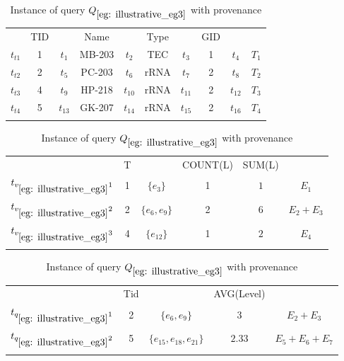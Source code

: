 \begin{example}
{\begin{table}[htp]
\begin{tabular}[t]{c|c|c|c|c|c|c|c|c|c|} \hhline{~---------}
&TID&&Name&&Type&&GID&&\\ \hhline{~---------}
$t_{t1}$&1&$t_1$&MB-203&$t_2$&TEC&$t_3$&1&$t_4$&$T_1$\\ \hhline{~---------}
$t_{t2}$&2&$t_5$&PC-203&$t_6$&rRNA&$t_7$&2&$t_8$&$T_2$\\ \hhline{~---------}
$t_{t3}$&4&$t_9$&HP-218&$t_{10}$&rRNA&$t_{11}$&2&$t_{12}$&$T_3$\\ \hhline{~---------}
$t_{t4}$&5&$t_{13}$&GK-207&$t_{14}$&rRNA&$t_{15}$&2&$t_{16}$&$T_4$\\ \hhline{~---------}
\end{tabular}
\bigskip
\caption{Instance of view $V_{\ref{eg: illustrative_eg3}}$ with provenance}\label{Table: Sample instance of V with provenance}
\begin{tabular}[t]{c|c|c|c|c|c|} \hhline{~-----}
&T&&COUNT(L)&SUM(L)&\\ \hhline{~-----}
$t_{v_{\ref{eg: illustrative_eg3}}1}$&1&$\{e_3\}$&1&$1$&$E_1$\\ \hhline{~-----}
$t_{v_{\ref{eg: illustrative_eg3}}2}$&2&$\{e_6, e_9\}$&2&$6$&$E_2 + E_3$\\ \hhline{~-----}
$t_{v_{\ref{eg: illustrative_eg3}}3}$&4&$\{e_{12}\}$&1&$2$&$E_4$\\ \hhline{~-----}
\end{tabular}
\bigskip
\caption{Instance of query $Q_{\ref{eg: illustrative_eg3}}$ with provenance}\label{Table: Sample instance of Q with provenance}
\begin{tabular}[t]{c|c|c|c|c|} \hhline{~----}
&Tid&&AVG(Level)&\\ \hhline{~----}
$t_{q_{\ref{eg: illustrative_eg3}}1}$&2&$\{e_6, e_9\}$&$3$&$E_2 + E_3$\\ \hhline{~----}
$t_{q_{\ref{eg: illustrative_eg3}}2}$&5&$\{e_{15}, e_{18}, e_{21}\}$&$2.33$&$E_5 + E_6 + E_7$\\ \hhline{~----}
\end{tabular}


\end{table}}
\end{example}

